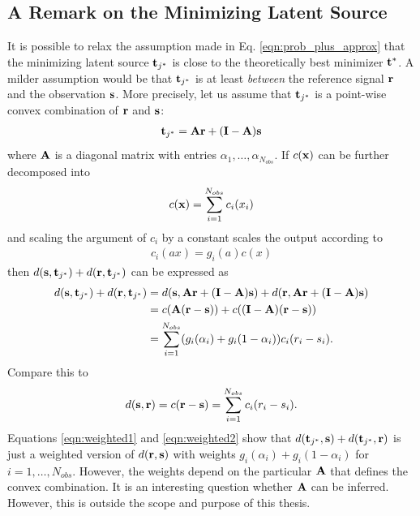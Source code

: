 \subsection{A Remark on the Minimizing Latent Source}
It is possible to relax the assumption made in Eq. \ref{eqn:prob_plus_approx}
that the minimizing latent source $\mathbf t_{j^*}$ is close to the theoretically
best minimizer $\mathbf t^*$. A milder assumption would be that $\mathbf t_{j^*}$ is at
least {\em between} the reference signal $\mathbf r$ and the observation $\mathbf
s$. More precisely, let us assume that $\mathbf t_{j^*}$ is a point-wise convex
combination of $\mathbf r$ and $\mathbf s$:
\begin{gather}
\mathbf t_{j^*} = \mathbf A \mathbf r + (\mathbf I - \mathbf A) \mathbf s
\end{gather}
where $\mathbf A$ is a diagonal matrix with entries $\alpha_1, \dots, \alpha_{N_{obs}}$. If
$c(\mathbf x)$ can be further decomposed into
\begin{gather}
c(\mathbf x) = \sum_{i=1}^{N_{obs}} c_i(x_i)
\end{gather}
and scaling the argument of $c_i$ by a constant scales the output according to
\begin{gather}
c_i(ax) = g_i(a)c(x) 
\end{gather}
then $d(\mathbf s, \mathbf t_{j^*}) + d(\mathbf r, \mathbf t_{j^*})$ can be expressed as
\begin{align}
d(\mathbf s, \mathbf t_{j^*}) + d(\mathbf r, \mathbf t_{j^*}) &= d(\mathbf s, \mathbf A \mathbf r + (\mathbf I - \mathbf A)\mathbf s) + d(\mathbf r, \mathbf A \mathbf r + (\mathbf I - \mathbf A)\mathbf s)\notag\\
&= c(\mathbf A(\mathbf r -\mathbf s)) + c((\mathbf I - \mathbf A)(\mathbf r - \mathbf s))\notag\\
&= \sum_{i=1}^{N_{obs}} (g_i(\alpha_i) + g_i(1 - \alpha_i)) c_i(r_i - s_i).\label{eqn:weighted1}
\end{align}
Compare this to
\begin{gather}
d(\mathbf s,\mathbf r) = c(\mathbf r - \mathbf s) = \sum_{i=1}^{N_{obs}} c_i(r_i - s_i).\label{eqn:weighted2}
\end{gather}
Equations \ref{eqn:weighted1} and \ref{eqn:weighted2} show that $d(\mathbf t_{j^*},
\mathbf s) + d(\mathbf t_{j^*}, \mathbf r)$ is just a weighted version of $d(\mathbf r,\mathbf s)$
with weights $g_i(\alpha_i) + g_i(1 - \alpha_i)$ for $i = 1, \dots,
N_{obs}$. However, the weights depend on the particular $\mathbf A$ that defines the
convex combination. It is an interesting question whether $\mathbf A$ can be
inferred. However, this is outside the scope and purpose of this thesis.



